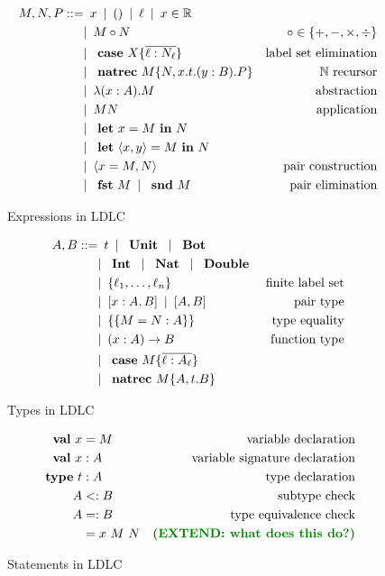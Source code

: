 \begin{figure}
\begin{align*}
 M,N,P ::=
    & \enspace x \enspace|\enspace
      () \enspace|\enspace
      \ell \enspace|\enspace
      x \in \mathbb{R} \\
    & |\enspace M \circ N & \circ \in \{+,-,\times,\div\} \\
    & |\enspace \text{ \textbf{case} } X \{\overline{\ell : N_\ell}\} & \text{label set elimination} \\
    & |\enspace \text{ \textbf{natrec} } M \{ N, x . t . (y : B) . P \} & \mathbb{N}\text{ recursor} \\
    & |\enspace \lambda (x : A).M & \text{abstraction} \\
    & |\enspace M N & \text{application}\\
    & |\enspace \text{ \textbf{let} } x = M \text{ \textbf{in} } N \\
    & |\enspace \text{ \textbf{let} } \langle x, y \rangle = M \text{ \textbf{in} } N \\
    & |\enspace \langle x = M, N \rangle & \text{pair construction}\\
    & |\enspace \text{ \textbf{fst} } M \enspace|\enspace \text{ \textbf{snd} } M & \text{pair elimination}
\end{align*}
\caption{Expressions in LDLC}
\label{fig:ldlc-expressions}
\end{figure}

\begin{figure}
\begin{align*}
 A, B ::=
    & \enspace t \enspace|\enspace
      \text{ \textbf{Unit} } \enspace|\enspace
      \text{ \textbf{Bot} } \\
    & |\enspace \text{ \textbf{Int} } \enspace|\enspace
      \text{ \textbf{Nat} } \enspace|\enspace
      \text{ \textbf{Double} } \\
    & |\enspace \{ \ell_1, \dots, \ell_n \} & \text{finite label set} \\
    & |\enspace [x:A,B] \enspace|\enspace [A,B] & \text{pair type} \\
    & |\enspace \{\{ M = N : A \}\} & \text{type equality} \\
    & |\enspace (x:A) \rightarrow B & \text{function type} \\
    & |\enspace \text{ \textbf{case} } M \{\overline{\ell : A_\ell}\} \\
    & |\enspace \text{ \textbf{natrec} } M \{ A, t.B \}
\end{align*}
\caption{Types in LDLC}
\label{fig:ldlc-types}
\end{figure}

\begin{figure}
\begin{align*}
    \valb x & = M & \text{variable declaration} \\
    \valb x & : A & \text{variable signature declaration} \\
    \typeb t & : A & \text{type declaration} \\
    A & <: B & \text{subtype check} \\
    A & =: B & \text{type equivalence check} \\
    & = x\ M\ N & \text{\extend{what does this do?}}
\end{align*}
\caption{Statements in LDLC}
\label{fig:ldlc-statements}
\end{figure}


